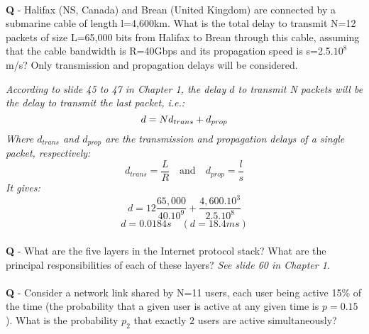 \documentclass{llncs}
\newcounter{ques}
\renewcommand{\question}[1]{\paragraph{}\textbf{Q\theques} - #1\stepcounter{ques} }
\newcommand{\answer}[1]{\color{red}\textit{#1}\color{black}}
\begin{document}
\newpage

\question{Halifax (NS, Canada) and Brean (United Kingdom) are
  connected by a submarine cable of length l=4,600km. What is the
  total delay to transmit N=12 packets of size L=65,000 bits from
  Halifax to Brean through this cable, assuming that the cable bandwidth is
  R=40Gbps and its propagation speed is s=2.5.$10^8$m/s? Only
  transmission and propagation delays will be considered.}

\answer{ According to slide 45 to 47 in Chapter 1, the delay $d$ to
  transmit N packets will be the delay to transmit the last packet, i.e.:
  \begin{equation*}
    d=Nd_{trans} + d_{prop} \\
  \end{equation*}
  Where $d_{trans}$ and $d_{prop}$ are the transmission and
  propagation delays of a single packet, respectively:
  \begin{equation*}
    d_{trans} = \frac{L}{R} \quad \mathrm{and} \quad d_{prop} = \frac{l}{s}
  \end{equation*}
  It gives:
  \begin{equation*}
    d = 12\frac{65,000}{40.10^9}+\frac{4,600.10^3}{2.5.10^8}
  \end{equation*}
  \begin{equation*}
    d = 0.0184s \quad (d= 18.4ms)
  \end{equation*}
}

\newpage



\question{What are the five layers in the Internet protocol stack?
  What are the principal responsibilities of each of these layers?}
\answer{See slide 60 in Chapter 1.}

\newpage

\question{Consider a network link shared by N=11 users, each user
  being active 15\% of the time (the probability that a given user is
  active at any given time is $p=0.15$). What is the probability $p_2$ that exactly $2$
  users are active simultaneously?}
\end{document}
